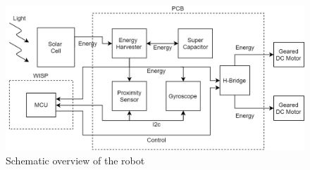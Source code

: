 \begin{figure}
	\centering
	\includegraphics[width=\textwidth]{pics/schematic_robot_v2.png}
	\caption{Schematic overview of the robot}
	\label{fig:robot_overview}
\end{figure}


